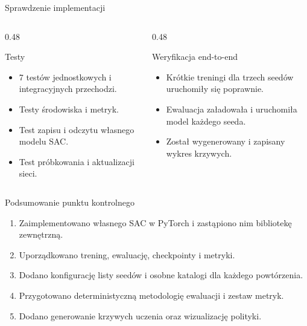 \documentclass[aspectratio=169,11pt]{beamer}
\begin{document}
\begin{frame}{Sprawdzenie implementacji}
  \begin{columns}[T,onlytextwidth]
    \begin{column}{0.48\textwidth}
      \begin{block}{Testy}
        \begin{itemize}
          \item 7 testów jednostkowych i integracyjnych przechodzi.
          \item Testy środowiska i metryk.
          \item Test zapisu i odczytu własnego modelu SAC.
          \item Test próbkowania i aktualizacji sieci.
        \end{itemize}
      \end{block}
    \end{column}
    \begin{column}{0.48\textwidth}
      \begin{block}{Weryfikacja end-to-end}
        \begin{itemize}
          \item Krótkie treningi dla trzech seedów uruchomiły się poprawnie.
          \item Ewaluacja załadowała i uruchomiła model każdego seeda.
          \item Został wygenerowany i zapisany wykres krzywych.
        \end{itemize}
      \end{block}
    \end{column}
  \end{columns}
\end{frame}

\begin{frame}{Podsumowanie punktu kontrolnego}
  \begin{enumerate}
    \setlength{\itemsep}{0.7em}
    \item Zaimplementowano własnego SAC w PyTorch i zastąpiono nim bibliotekę zewnętrzną.
    \item Uporządkowano trening, ewaluację, checkpointy i metryki.
    \item Dodano konfigurację listy seedów i osobne katalogi dla każdego powtórzenia.
    \item Przygotowano deterministyczną metodologię ewaluacji i zestaw metryk.
    \item Dodano generowanie krzywych uczenia oraz wizualizację polityki.
  \end{enumerate}
\end{frame}
\end{document}

